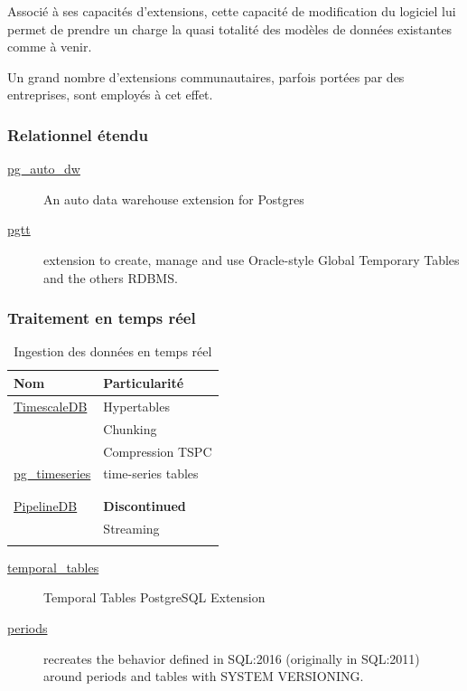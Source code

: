 \documentclass[a4paper,12pt]{article}
\begin{document}
\begin{multicols*}{2}
Associé à ses capacités d'extensions, cette capacité de modification du logiciel lui permet de prendre un charge la quasi totalité des modèles de données existantes comme à venir.

Un grand nombre d'extensions communautaires, parfois portées par des entreprises, sont employés à cet effet.
\subsubsection*{Relationnel étendu}
\label{sec:orgd9b23ae}
\begin{description}
\item[{\href{https://github.com/tembo-io/pg\_auto\_dw}{pg\_auto\_dw}}] An auto data warehouse extension for Postgres
\item[{\href{https://github.com/darold/pgtt}{pgtt}}] extension to create, manage and use Oracle-style Global Temporary Tables and the others RDBMS.
\end{description}
\subsubsection*{Traitement en temps réel}
\label{sec:org0993bf5}
\begin{table}[H]
\caption{Ingestion des données en temps réel}
\centering
\begin{tabular}{ll}
Nom & Particularité\\
\hline
\href{https://github.com/timescale/timescaledb}{TimescaleDB} & Hypertables\\
 & Chunking\\
 & Compression TSPC\\
\href{https://github.com/tembo-io/pg\_timeseries}{pg\_timeseries} & time-series tables\\
 & \\
 & \\
\href{https://github.com/pipelinedb/pipelinedb}{PipelineDB} & \textbf{Discontinued}\\
 & Streaming\\
 & \\
\end{tabular}
\end{table}

\begin{description}
\item[{\href{https://github.com/arkhipov/temporal\_tables}{temporal\_tables}}] Temporal Tables PostgreSQL Extension
\item[{\href{https://github.com/xocolatl/periods}{periods}}] recreates the behavior defined in SQL:2016 (originally in SQL:2011) around periods and tables with SYSTEM VERSIONING.
\end{description}


\end{multicols*}
\end{document}
